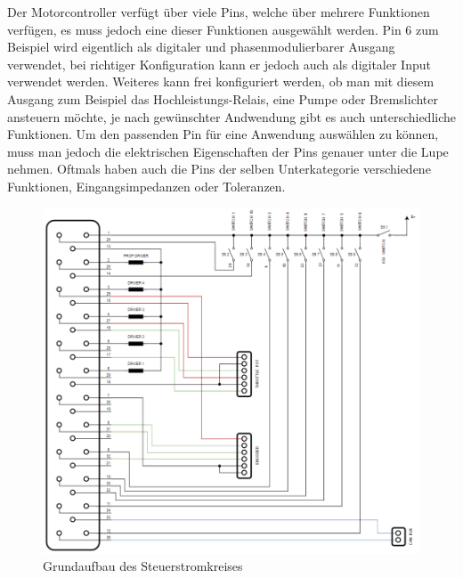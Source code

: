\vspace{5mm}

Der Motorcontroller verfügt über viele Pins, welche über mehrere Funktionen verfügen, es muss jedoch eine dieser Funktionen ausgewählt werden. Pin 6 zum Beispiel wird eigentlich als digitaler und phasenmodulierbarer Ausgang verwendet, bei richtiger Konfiguration kann er jedoch auch als digitaler Input verwendet werden. Weiteres kann frei konfiguriert werden, ob man mit diesem Ausgang zum Beispiel das Hochleistungs-Relais, eine Pumpe oder Bremslichter ansteuern möchte, je nach gewünschter Andwendung gibt es auch unterschiedliche Funktionen. Um den passenden Pin für eine Anwendung auswählen zu können, muss man jedoch die elektrischen Eigenschaften der Pins genauer unter die Lupe nehmen. Oftmals haben auch die Pins der selben Unterkategorie verschiedene Funktionen, Eingangsimpedanzen oder Toleranzen. 

\newpage

\begin{figure}[H]
	\begin{center}
		\includegraphics[scale=0.75]{figures/Antrieb/Antrieb_Steuerstromkreis.png}
		\caption{Grundaufbau des Steuerstromkreises}
	\end{center}
\end{figure}

\newpage

